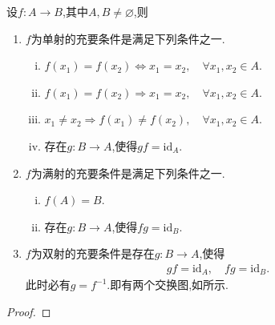\documentclass[../../main.tex]{subfiles}%
\begin{document}
\begin{theorem}
设$f:A\to B$,其中$A,B\neq \varnothing$,则
\begin{enumerate}[(1)]
\item $f$为单射的充要条件是满足下列条件之一.
\begin{enumerate}[(i)]
\item $f(x_1)=f(x_2)\iff x_1=x_2,\quad \forall x_1,x_2\in A.$

\item $f(x_1)=f(x_2)\Longrightarrow x_1=x_2,\quad \forall x_1,x_2\in A.$

\item $x_1\ne x_2\Longrightarrow f(x_1)\ne f(x_2),\quad \forall x_1,x_2\in A.$

\item 存在$g:B\to A$,使得$gf=\text{id}_A.$
\end{enumerate}

\item $f$为满射的充要条件是满足下列条件之一.
\begin{enumerate}[(i)]
\item $f(A)=B.$

\item 存在$g:B\to A$,使得$fg=\text{id}_B.$
\end{enumerate}

\item $f$为双射的充要条件是存在$g:B\to A$,使得
\begin{align*}
gf=\text{id}_A,\quad fg=\text{id}_B.
\end{align*}
此时必有$g=f^{-1}$.即有两个交换图,如所示.
\end{enumerate}
\end{theorem}
\begin{note}
\begin{figure}[H]
\centering
\caption{}
\label{figure:交换图fiou3nr4-1}
\end{figure}
\end{note}
\begin{proof}

\end{proof}
\end{document}
